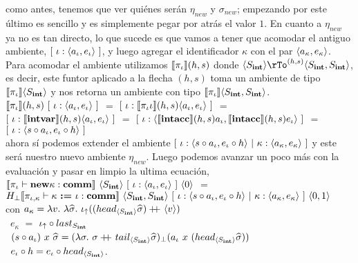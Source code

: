 como antes, tenemos que ver qui\'enes ser\'an $\eta_{new}$ y $\sigma_{new}$; empezando por
este \'ultimo es sencillo y es simplemente pegar por atr\'as el valor $1$. En cuanto a
$\eta_{new}$ ya no es tan directo, lo que sucede es que vamos a tener que acomodar el
antiguo ambiente, $[ \ \iota : \langle a_\iota,e_\iota \rangle \ ]$, y luego agregar
el identificador $\kappa$ con el par $\langle a_\kappa,e_\kappa \rangle$.\\
Para acomodar el ambiente utilizamos 
$\llbracket \pi_\iota \rrbracket(h,s)$ donde $\lrangles{S_\intt} \rTo^{(h,s)} \lrangles{S_\intt,S_\intt}$,
es decir, este funtor aplicado a la flecha $(h,s)$ toma un ambiente de tipo
$\llbracket \pi_\iota \rrbracket\langle S_{\textbf{int}} \rangle$ y nos retorna un ambiente con tipo 
$\llbracket \pi_\iota \rrbracket\langle S_{\textbf{int}},S_{\textbf{int}} \rangle$.\\

$\llbracket \pi_\iota \rrbracket(h,s) \ [ \ \iota : \langle a_\iota,e_\iota \rangle \ ]$ $=$
$[ \ \iota : \llbracket \pi_\iota \iota \rrbracket(h,s) \langle a_\iota,e_\iota \rangle \ ]$ $=$\\

\indent
$[ \ \iota : \llbracket \textbf{intvar} \rrbracket(h,s) \langle a_\iota,e_\iota \rangle \ ]$ $=$
$[ \ \iota : \langle \llbracket \textbf{intacc} \rrbracket(h,s) a_\iota,\llbracket \textbf{intacc} \rrbracket(h,s)e_\iota \rangle \ ]$ $=$\\

\indent
$[ \ \iota : \langle s \circ a_\iota,e_\iota \circ h \rangle \ ]$\\

\noindent
ahora s\'i podemos extender el ambiente 
$[ \ \iota : \lrangles{s \circ a_\iota,e_\iota \circ h} \ | \
	\kappa : \lrangles{a_\kappa,e_\kappa}\ ]$ y este ser\'a nuestro nuevo ambiente $\eta_{new}$.
Luego podemos avanzar un poco m\'as con la evaluaci\'on y pasar en limpio la ultima ecuaci\'on,\\

\noindent
$\semBrcks{\pi_\iota \vdash \cnew \kappa : \commt}
	\ \lrangles{S_\intt} \ 
	[ \ \iota : \lrangles{a_\iota,e_\iota} \ ] \ \lrangles{0}$ $=$ \\
	\indent 
	$H_{\bot} 
	\llbracket \pi_{\iota,\kappa} \vdash \kappa \ \textbf{:=} \ \iota: \textbf{comm} \rrbracket
		\ \langle S_{\textbf{int}},S_{\textbf{int}} \rangle
		\ [ \ \iota : \langle s \circ a_\iota,e_\iota \circ h \rangle \ | \
			\kappa : \langle a_\kappa,e_\kappa \rangle\ ] 
		\ \langle 0,1 \rangle$\\

con $a_\kappa = \lambda v. \ \lambda \widehat{\sigma} . \ \iota_{\uparrow} 
				((head_{\langle S_{\textbf{int}} \rangle} \widehat{\sigma}) +\kern-1.3ex+\kern0.8ex \langle v \rangle)$\\
\indent \indent \ 
	$e_\kappa$ $=$ $ \iota_{\uparrow} \circ last_{S_{\textbf{int}}}$\\
\indent \indent \ 
	$(s \circ a_\iota) \ x \ \widehat{\sigma} = 
		(\lambda \sigma . \ \sigma +\kern-1.3ex+\kern0.8ex tail_{\langle S_{\textbf{int}} \rangle}\widehat{\sigma})_{\bot} 
			(a_\iota \ x \ (head_{\langle S_{\textbf{int}} \rangle} \widehat{\sigma}))$\\
\indent \indent \ 
	$e_\iota \circ h = e_\iota \circ head_{\langle S_{\textbf{int}} \rangle}$.\\
	
